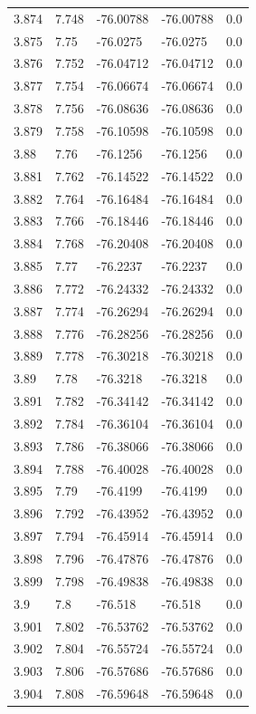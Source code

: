 \begin{tabular}{lllll}
3.874 & 7.748 & -76.00788 & -76.00788 & 0.0 \\
3.875 & 7.75 & -76.0275 & -76.0275 & 0.0 \\
3.876 & 7.752 & -76.04712 & -76.04712 & 0.0 \\
3.877 & 7.754 & -76.06674 & -76.06674 & 0.0 \\
3.878 & 7.756 & -76.08636 & -76.08636 & 0.0 \\
3.879 & 7.758 & -76.10598 & -76.10598 & 0.0 \\
3.88 & 7.76 & -76.1256 & -76.1256 & 0.0 \\
3.881 & 7.762 & -76.14522 & -76.14522 & 0.0 \\
3.882 & 7.764 & -76.16484 & -76.16484 & 0.0 \\
3.883 & 7.766 & -76.18446 & -76.18446 & 0.0 \\
3.884 & 7.768 & -76.20408 & -76.20408 & 0.0 \\
3.885 & 7.77 & -76.2237 & -76.2237 & 0.0 \\
3.886 & 7.772 & -76.24332 & -76.24332 & 0.0 \\
3.887 & 7.774 & -76.26294 & -76.26294 & 0.0 \\
3.888 & 7.776 & -76.28256 & -76.28256 & 0.0 \\
3.889 & 7.778 & -76.30218 & -76.30218 & 0.0 \\
3.89 & 7.78 & -76.3218 & -76.3218 & 0.0 \\
3.891 & 7.782 & -76.34142 & -76.34142 & 0.0 \\
3.892 & 7.784 & -76.36104 & -76.36104 & 0.0 \\
3.893 & 7.786 & -76.38066 & -76.38066 & 0.0 \\
3.894 & 7.788 & -76.40028 & -76.40028 & 0.0 \\
3.895 & 7.79 & -76.4199 & -76.4199 & 0.0 \\
3.896 & 7.792 & -76.43952 & -76.43952 & 0.0 \\
3.897 & 7.794 & -76.45914 & -76.45914 & 0.0 \\
3.898 & 7.796 & -76.47876 & -76.47876 & 0.0 \\
3.899 & 7.798 & -76.49838 & -76.49838 & 0.0 \\
3.9 & 7.8 & -76.518 & -76.518 & 0.0 \\
3.901 & 7.802 & -76.53762 & -76.53762 & 0.0 \\
3.902 & 7.804 & -76.55724 & -76.55724 & 0.0 \\
3.903 & 7.806 & -76.57686 & -76.57686 & 0.0 \\
3.904 & 7.808 & -76.59648 & -76.59648 & 0.0 \\

\end{tabular}
